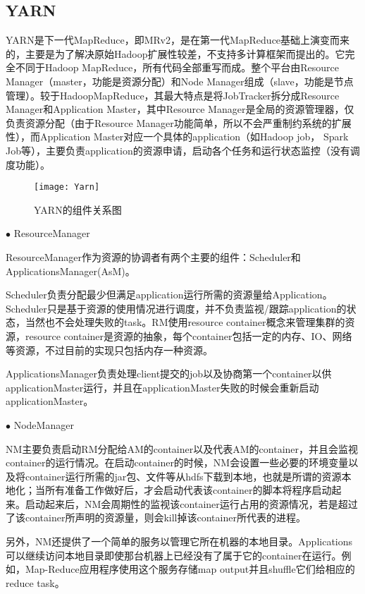 \subsection{YARN}
YARN是下一代MapReduce，即MRv2，是在第一代MapReduce基础上演变而来的，主要是为了解决原始Hadoop扩展性较差，不支持多计算框架而提出的。它完全不同于Hadoop MapReduce，所有代码全部重写而成。整个平台由Resource Manager（master，功能是资源分配）和Node Manager组成（slave，功能是节点管理）。较于HadoopMapReduce，其最大特点是将JobTracker拆分成Resource Manager和Application Master，其中Resource Manager是全局的资源管理器，仅负责资源分配（由于Resource Manager功能简单，所以不会严重制约系统的扩展性），而Application Master对应一个具体的application（如Hadoop job， Spark Job等），主要负责application的资源申请，启动各个任务和运行状态监控（没有调度功能）。
\begin{figure}[htbp]
\centering\texttt{[image: Yarn]}
\caption{YARN的组件关系图}\label{fig:Yarn}
\end{figure}

$\bullet$ ResourceManager

ResourceManager作为资源的协调者有两个主要的组件：Scheduler和ApplicationsManager(AsM)。

Scheduler负责分配最少但满足application运行所需的资源量给Application。Scheduler只是基于资源的使用情况进行调度，并不负责监视/跟踪application的状态，当然也不会处理失败的task。RM使用resource container概念来管理集群的资源，resource container是资源的抽象，每个container包括一定的内存、IO、网络等资源，不过目前的实现只包括内存一种资源。

ApplicationsManager负责处理client提交的job以及协商第一个container以供applicationMaster运行，并且在applicationMaster失败的时候会重新启动applicationMaster。

$\bullet$ NodeManager

NM主要负责启动RM分配给AM的container以及代表AM的container，并且会监视container的运行情况。在启动container的时候，NM会设置一些必要的环境变量以及将container运行所需的jar包、文件等从hdfs下载到本地，也就是所谓的资源本地化；当所有准备工作做好后，才会启动代表该container的脚本将程序启动起来。启动起来后，NM会周期性的监视该container运行占用的资源情况，若是超过了该container所声明的资源量，则会kill掉该container所代表的进程。

另外，NM还提供了一个简单的服务以管理它所在机器的本地目录。Applications可以继续访问本地目录即使那台机器上已经没有了属于它的container在运行。例如，Map-Reduce应用程序使用这个服务存储map output并且shuffle它们给相应的reduce task。

